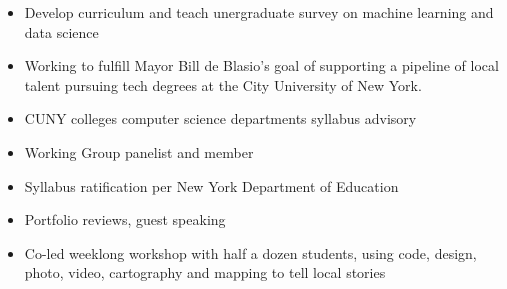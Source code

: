 \documentclass[a4paper,10pt]{memoir} %
\begin{document}
\begin{itemize}
	\item Develop curriculum and teach unergraduate survey on machine learning and data science
\end{itemize}

\Sep %


\begin{itemize}
	\item Working to fulfill Mayor Bill de Blasio’s goal of supporting a pipeline of local talent pursuing tech degrees at the City University of New York.
\end{itemize}

\Sep %

\begin{itemize}
	\item CUNY colleges computer science departments syllabus advisory 
	\item Working Group panelist and member
\end{itemize}

\Sep %

\begin{itemize}
	\item Syllabus ratification per New York Department of Education 
	\item Portfolio reviews, guest speaking
\end{itemize}

\Sep %


\begin{itemize}
	\item Co-led weeklong workshop with half a dozen students, using code, design, photo, video, cartography and mapping to tell local stories
\end{itemize}
\end{document}
